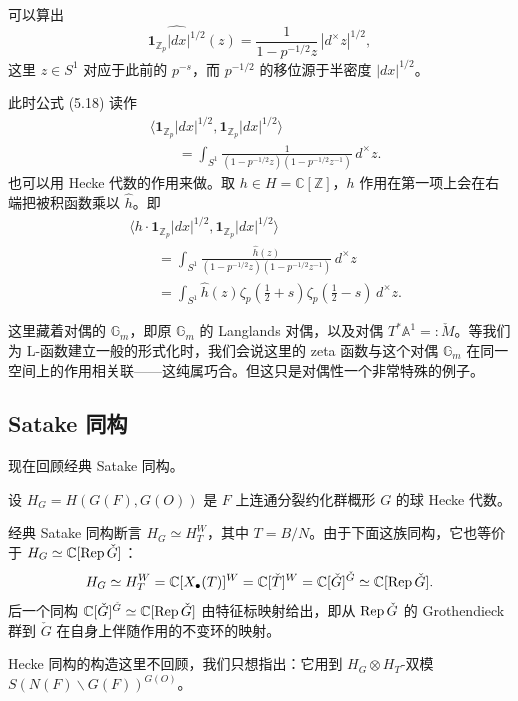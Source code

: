 可以算出
\[
  \widehat{\mathbf 1_{\mathbb Z_p}|dx|^{1/2}}(z)=\frac{1}{1-p^{-1/2}z}\,|d^\times z|^{1/2},
\]
这里 $z\in S^1$ 对应于此前的 $p^{-s}$，而 $p^{-1/2}$ 的移位源于半密度 $|dx|^{1/2}$。

此时公式 (5.18) 读作
\[
  \begin{aligned}
  &\langle\mathbf 1_{\mathbb Z_p}|dx|^{1/2},\mathbf 1_{\mathbb Z_p}|dx|^{1/2}\rangle\\
  &\qquad=\int_{S^1}\frac{1}{(1-p^{-1/2}z)(1-p^{-1/2}z^{-1})}\,d^\times z.
  \end{aligned}
\]
也可以用 Hecke 代数的作用来做。取 $h\in H=\mathbb C[\mathbb Z]$，$h$ 作用在第一项上会在右端把被积函数乘以 $\hat h$。即
\[
  \begin{aligned}
  &\langle h\cdot\mathbf 1_{\mathbb Z_p}|dx|^{1/2},\mathbf 1_{\mathbb Z_p}|dx|^{1/2}\rangle\\
  &\qquad=\int_{S^1}\frac{\hat h(z)}{(1-p^{-1/2}z)(1-p^{-1/2}z^{-1})}\,d^\times z\\
  &\qquad=\int_{S^1}\hat h(z)\zeta_p(\tfrac12+s)\zeta_p(\tfrac12-s)\,d^\times z.
  \end{aligned}
\]

这里藏着对偶的 $\mathbb G_m$，即原 $\mathbb G_m$ 的 Langlands 对偶，以及对偶 $T^*\mathbb A^1=:\check M$。等我们为 L-函数建立一般的形式化时，我们会说这里的 zeta 函数与这个对偶 $\mathbb G_m$ 在同一空间上的作用相关联——这纯属巧合。但这只是对偶性一个非常特殊的例子。

\subsection{Satake 同构}

现在回顾经典 Satake 同构。

设 $H_G=H(G(F),G(O))$ 是 $F$ 上连通分裂约化群概形 $G$ 的球 Hecke 代数。

经典 Satake 同构断言 $H_G\simeq H_T^W$，其中 $T=B/N$。由于下面这族同构，它也等价于 $H_G\simeq\mathbb C[\operatorname{Rep}\check G]$：
\begin{equation}
  H_G\simeq H_T^W=\mathbb C[X_\bullet(T)]^W=\mathbb C[\check T]^W=\mathbb C[\check G]^{\check G}\simeq\mathbb C[\operatorname{Rep}\check G].
  \label{eq:5-19}
\end{equation}
后一个同构 $\mathbb C[\check G]^{\check G}\simeq\mathbb C[\operatorname{Rep}\check G]$ 由特征标映射给出，即从 $\operatorname{Rep}\check G$ 的 Grothendieck 群到 $\check G$ 在自身上伴随作用的不变环的映射。

Hecke 同构的构造这里不回顾，我们只想指出：它用到 $H_G\otimes H_T$-双模 $S(N(F)\backslash G(F))^{G(O)}$。

